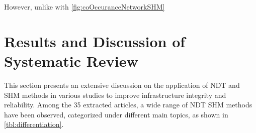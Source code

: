 \documentclass[journal, a4paper]{IEEEtran}
\begin{document}
However, unlike with \autoref{fig:coOccuranceNetworkSHM} \lipsum[1]





\section{Results and Discussion of Systematic Review}
This section presents an extensive discussion on the application of NDT
and SHM methods in various studies to improve infrastructure integrity and reliability.
Among the 35 extracted articles, a wide range of NDT SHM methods have been observed, categorized under different main topics,
as shown in \autoref{tbl:differentiation}. 
\end{document}
